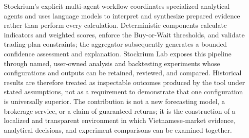 Stockrium's explicit multi-agent workflow coordinates specialized analytical agents and uses language models to interpret and synthesize prepared evidence rather than perform every calculation. Deterministic components calculate indicators and weighted scores, enforce the Buy-or-Wait thresholds, and validate trading-plan constraints; the aggregator subsequently generates a bounded confidence assessment and explanation. Stockrium Lab exposes this pipeline through named, user-owned analysis and backtesting experiments whose configurations and outputs can be retained, reviewed, and compared. Historical results are therefore treated as inspectable outcomes produced by the tool under stated assumptions, not as a requirement to demonstrate that one configuration is universally superior. The contribution is not a new forecasting model, a brokerage service, or a claim of guaranteed returns; it is the construction of a localized and transparent environment in which Vietnamese-market evidence, analytical decisions, and experiment comparisons can be examined together.

